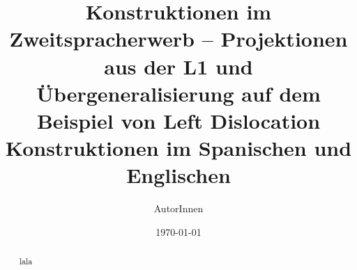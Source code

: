 \documentclass{scrartcl}
\title{Konstruktionen im Zweitspracherwerb -- Projektionen aus der L1 und Übergeneralisierung auf dem Beispiel von Left Dislocation Konstruktionen im Spanischen und Englischen}
\author{AutorInnen}
\date{\today}
\begin{document}
\maketitle

\begin{abstract}
    lala
\end{abstract}










\nocite{*}



\end{document}
